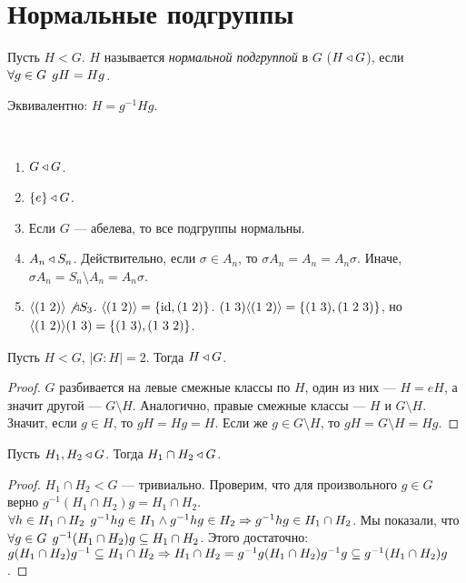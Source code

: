 \documentclass[main]{subfiles}
\begin{document}
\section{Нормальные подгруппы}
\begin{definition}
  Пусть $H < G$. $H$ называется \emph{нормальной подгруппой} в $G$
  ($H \triangleleft G$),
  если $\forall {g \in G} \; \, gH = Hg$.
\end{definition}
\begin{remark}
  Эквивалентно: $H = g^{-1} H g$.
\end{remark}

\begin{examples}~
  \begin{enumerate}
    \item $G \triangleleft G$.
    \item $\{ e \} \triangleleft G$.
    \item Если $G$ --- абелева, то все подгруппы нормальны.
    \item $A_n \triangleleft S_n$. Действительно, если $\sigma \in A_n$,
      то $\sigma A_n = A_n = A_n \sigma$. Иначе, $\sigma A_n =
      S_n \setminus A_n = A_n \sigma$.
    \item $\langle \Cycle{1 & 2} \rangle \not \NSG S_3$.
      $\langle \Cycle{1&2} \rangle = \{ \id, \Cycle{1 & 2} \}$.
      $\Cycle{1&3}\langle \Cycle{1&2} \rangle = \{ \Cycle{1&3}, \Cycle{1&2&3} \}$,
      но $\langle \Cycle{1&2} \rangle \Cycle{1&3} = \{ \Cycle{1&3}, \Cycle{1&3&2} \}$.
  \end{enumerate}
\end{examples}

\begin{proposition}
  Пусть $H < G$, $|G:H| = 2$. Тогда $H \triangleleft G$.
\end{proposition}
\begin{proof}
  $G$ разбивается на левые смежные классы по $H$, один из них --- $H = eH$,
  а значит другой --- $G \setminus H$. Аналогично, правые смежные классы --- $H$
  и $G \setminus H$. Значит, если $g \in H$, то $gH = Hg = H$. Если же $g \in G\setminus H$,
  то $gH = G \setminus H = Hg$.
\end{proof}

\begin{proposition}
  Пусть $H_1, H_2 \triangleleft G$. Тогда $H_1 \cap H_2 \triangleleft G$.
\end{proposition}
\begin{proof}
  $H_1 \cap H_2 < G$ --- тривиально.
  Проверим, что для произвольного \( g \in G \)
  верно $g^{-1}(H_1\cap H_2)g= H_1 \cap H_2$.
  $\forall {h \in H_1 \cap H_2} \; \, g^{-1}hg \in H_1 \wedge g^{-1}hg \in H_2 \Rightarrow
  g^{-1}hg \in H_1 \cap H_2$. Мы показали, что $\forall {g \in G} \; \, g^{-1}(H_1 \cap H_2)g \subseteq
  H_1 \cap H_2$. Этого достаточно:
  $g (H_1 \cap H_2) g^{-1} \subseteq H_1 \cap H_2 \Rightarrow
  H_1 \cap H_2 = g^{-1}g(H_1 \cap H_2) g^{-1} g \subseteq
  g^{-1} (H_1 \cap H_2) g$.
\end{proof}
\end{document}
